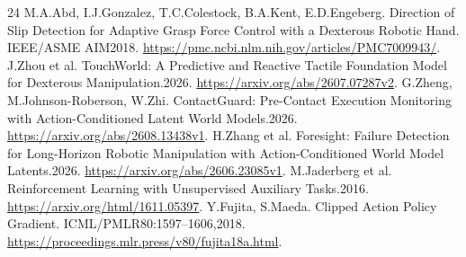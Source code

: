 \documentclass[10pt]{article}
\begin{document}
\begin{thebibliography}{24}
 M.A.Abd, I.J.Gonzalez, T.C.Colestock, B.A.Kent, E.D.Engeberg.
Direction of Slip Detection for Adaptive Grasp Force Control with a Dexterous
Robotic Hand. IEEE/ASME AIM2018. \url{https://pmc.ncbi.nlm.nih.gov/articles/PMC7009943/}.
 J.Zhou et al. TouchWorld: A Predictive and Reactive Tactile
Foundation Model for Dexterous Manipulation.2026. \url{https://arxiv.org/abs/2607.07287v2}.
 G.Zheng, M.Johnson-Roberson, W.Zhi. ContactGuard: Pre-Contact
Execution Monitoring with Action-Conditioned Latent World Models.2026.
\url{https://arxiv.org/abs/2608.13438v1}.
 H.Zhang et al. Foresight: Failure Detection for Long-Horizon
Robotic Manipulation with Action-Conditioned World Model Latents.2026.
\url{https://arxiv.org/abs/2606.23085v1}.
 M.Jaderberg et al. Reinforcement Learning with Unsupervised Auxiliary Tasks.2016. \url{https://arxiv.org/html/1611.05397}.
 Y.Fujita, S.Maeda. Clipped Action Policy Gradient. ICML/PMLR80:1597--1606,2018. \url{https://proceedings.mlr.press/v80/fujita18a.html}.
\end{thebibliography}
\end{document}
